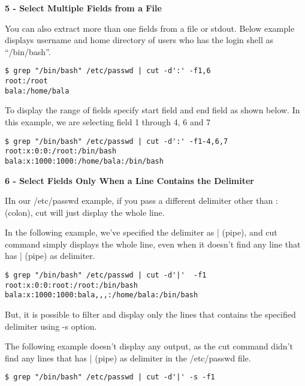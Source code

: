 \documentclass[a4paper,11pt,spanish]{article} %
\newenvironment{myscriptlisting}
{\begin{list}{}{\setlength{\leftmargin}{1em}}\item\scriptsize\bfseries}
{\end{list}}
\begin{document}
\textbf{5 - Select Multiple Fields from a File}

You can also extract more than one fields from a file or stdout. Below example
displays username and home directory of users who has the login shell as “/bin/bash”.

\begin{myscriptlisting}
 \begin{verbatim}
$ grep "/bin/bash" /etc/passwd | cut -d':' -f1,6
root:/root
bala:/home/bala
 \end{verbatim}
\end{myscriptlisting}

To display the range of fields specify start field and end field as shown below.
In this example, we are selecting field 1 through 4, 6 and 7

\begin{myscriptlisting}
 \begin{verbatim}
$ grep "/bin/bash" /etc/passwd | cut -d':' -f1-4,6,7
root:x:0:0:/root:/bin/bash
bala:x:1000:1000:/home/bala:/bin/bash
 \end{verbatim}
\end{myscriptlisting}

\textbf{6 - Select Fields Only When a Line Contains the Delimiter}

IIn our /etc/passwd example, if you pass a different delimiter other than :
(colon), cut will just display the whole line.

In the following example, we’ve specified the delimiter as | (pipe), and cut
command simply displays the whole line, even when it doesn’t find any line
that has | (pipe) as delimiter.

\begin{myscriptlisting}
 \begin{verbatim}
$ grep "/bin/bash" /etc/passwd | cut -d'|'  -f1
root:x:0:0:root:/root:/bin/bash
bala:x:1000:1000:bala,,,:/home/bala:/bin/bash
 \end{verbatim}
\end{myscriptlisting}

But, it is possible to filter and display only the lines that contains the
specified delimiter using -s option.

The following example doesn’t display any output, as the cut command didn’t find
any lines that has | (pipe) as delimiter in the /etc/passwd file.

\begin{myscriptlisting}
 \begin{verbatim}
$ grep "/bin/bash" /etc/passwd | cut -d'|' -s -f1
 \end{verbatim}
\end{myscriptlisting}
\end{document}
